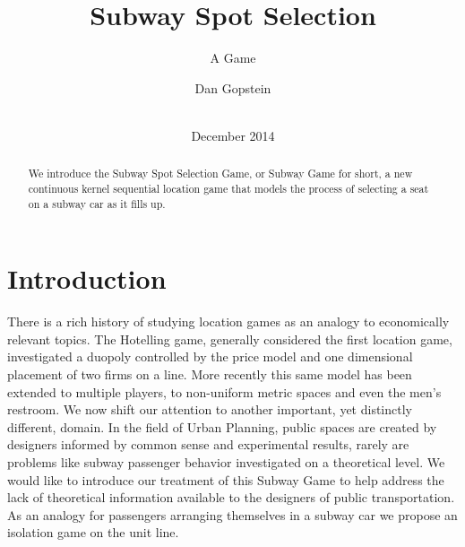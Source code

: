 \documentclass{acm_proc_article-sp}
\begin{document}
\title{Subway Spot Selection}
\subtitle{A Game}

\author{
\alignauthor
       Dan Gopstein\\
       \\
}

\date{December 2014}

\maketitle
\begin{abstract}
We introduce the Subway Spot Selection Game, or Subway Game for short, a new continuous kernel sequential location game that models the process of selecting a seat on a subway car as it fills up.
\end{abstract}

\section{Introduction}
There is a rich history of studying location games as an analogy to economically relevant topics. The Hotelling game\cite{hotelling1990stability}, generally considered the first location game, investigated a duopoly controlled by the price model and one dimensional placement of two firms on a line. More recently this same model has been extended to multiple players\cite{economides1993hotelling}, to non-uniform metric spaces\cite{zhao2008isolation} and even the men's restroom\cite{heufer2011washroom, kranakis2010urinal}.
\indent We now shift our attention to another important, yet distinctly different, domain. In the field of Urban Planning, public spaces are created by designers informed by common sense and experimental results, rarely are problems like subway passenger behavior investigated on a theoretical level. We would like to introduce our treatment of this Subway Game to help address the lack of theoretical information available to the designers of public transportation. As an analogy for passengers arranging themselves in a subway car we propose an isolation game on the unit line.
\end{document}
